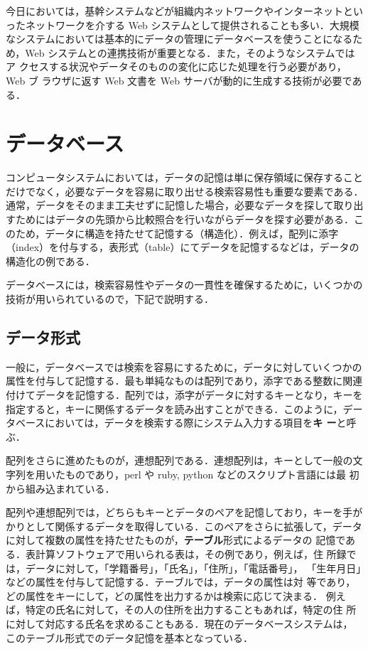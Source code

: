 
今日においては，基幹システムなどが組織内ネットワークやインターネットとい
ったネットワークを介する Web システムとして提供されることも多い．大規模
なシステムにおいては基本的にデータの管理にデータベースを使うことになるた
め，Web システムとの連携技術が重要となる．また，そのようなシステムではア
クセスする状況やデータそのものの変化に応じた処理を行う必要があり，Web ブ
ラウザに返す Web 文書を Web サーバが動的に生成する技術が必要である．

\section{データベース}
コンピュータシステムにおいては，データの記憶は単に保存領域に保存すること
だけでなく，必要なデータを容易に取り出せる検索容易性も重要な要素である．
通常，データをそのまま工夫せずに記憶した場合，必要なデータを探して取り出
すためにはデータの先頭から比較照合を行いながらデータを探す必要がある．こ
のため，データに構造を持たせて記憶する（構造化）．例えば，配列に添字
（index）を付与する，表形式（table）にてデータを記憶するなどは，データの
構造化の例である．

データベースには，検索容易性やデータの一貫性を確保するために，いくつかの
技術が用いられているので，下記で説明する．

\subsection{データ形式}
一般に，データベースでは検索を容易にするために，データに対していくつかの
属性を付与して記憶する．最も単純なものは配列であり，添字である整数に関連
付けてデータを記憶する．配列では，添字がデータに対するキーとなり，キーを
指定すると，キーに関係するデータを読み出すことができる．このように，デー
タベースにおいては，データを検索する際にシステム入力する項目を\textbf{キ
ー}と呼ぶ．

配列をさらに進めたものが，連想配列である．連想配列は，キーとして一般の文
字列を用いたものであり，perl や ruby, python などのスクリプト言語には最
初から組み込まれている．

配列や連想配列では，どちらもキーとデータのペアを記憶しており，キーを手が
かりとして関係するデータを取得している．このペアをさらに拡張して，データ
に対して複数の属性を持たせたものが，\textbf{テーブル}形式によるデータの
記憶である．表計算ソフトウェアで用いられる表は，その例であり，例えば，住
所録では，データに対して，「学籍番号」，「氏名」，「住所」，「電話番号」，
「生年月日」などの属性を付与して記憶する．テーブルでは，データの属性は対
等であり，どの属性をキーにして，どの属性を出力するかは検索に応じて決まる．
例えば，特定の氏名に対して，その人の住所を出力することもあれば，特定の住
所に対して対応する氏名を求めることもある．現在のデータベースシステムは，
このテーブル形式でのデータ記憶を基本となっている．

